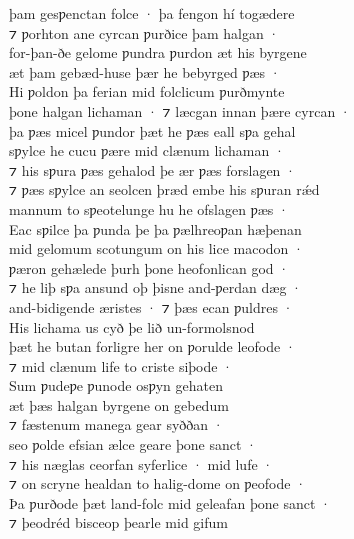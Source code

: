 \documentclass[10pt]{book}
\begin{document}
\settowidth{}

\begin{center}
\parbox{\pagelen}{
þam gesƿenctan folce · þa fengon h\'i tog\ae{}dere \\
⁊ ƿorhton ane cyrcan ƿurðice þam halgan · \\
for-þan-ðe gelome ƿundra ƿurdon \ae{}t his byrgene \\
\ae{}t þam geb\ae{}d-huse þ\ae{}r he bebyrged ƿ\ae{}s · \\
Hi ƿoldon þa ferian mid folclicum ƿurðmynte \\
þone halgan lichaman · ⁊ l\ae{}cgan innan þ\ae{}re cyrcan · \\
þa ƿ\ae{}s micel ƿundor þ\ae{}t he ƿ\ae{}s eall sƿa gehal \\
sƿylce he cucu ƿ\ae{}re mid cl\ae{}num lichaman · \\
⁊ his sƿura ƿ\ae{}s gehalod þe \ae{}r ƿ\ae{}s forslagen · \\
⁊ ƿ\ae{}s sƿylce an seolcen þr\ae{}d embe his sƿuran r\'\ae{}d \\
mannum to sƿeotelunge hu he ofslagen ƿ\ae{}s · \\
Eac sƿilce þa ƿunda þe þa ƿ\ae{}lhreoƿan h\ae{}þenan \\
mid gelomum scotungum on his lice macodon · \\
ƿ\ae{}ron geh\ae{}lede þurh þone heofonlican god · \\
⁊ he liþ sƿa ansund oþ þisne and-ƿerdan d\ae{}g · \\
and-bidigende \ae{}ristes · ⁊ þ\ae{}s ecan ƿuldres · \\
His lichama us cyð þe lið un-formolsnod \\
þ\ae{}t he butan forligre her on ƿorulde leofode · \\
⁊ mid cl\ae{}num life to criste siþode · \\
Sum ƿudeƿe ƿunode osƿyn gehaten \\
\ae{}t þ\ae{}s halgan byrgene on gebedum \\
⁊ f\ae{}stenum manega gear syððan · \\
seo ƿolde efsian \ae{}lce geare þone sanct · \\
⁊ his n\ae{}glas ceorfan syferlice · mid lufe · \\
⁊ on scryne healdan to halig-dome on ƿeofode · \\
Þa ƿurðode þ\ae{}t land-folc mid geleafan þone sanct · \\ 
⁊ þeodr\'ed bisceop þearle mid gifum \\
}
\end{center}
\end{document}
